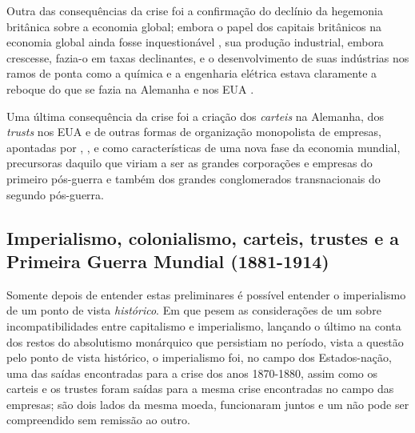 Outra das consequências da crise foi a confirmação do declínio da hegemonia britânica sobre a economia global; embora o papel dos capitais britânicos na economia global ainda fosse inquestionável \cite{goetzmann_british_2006,rippy_britlat_1954,stone_british_1977}, sua produção industrial, embora crescesse, fazia-o em taxas declinantes, e o desenvolvimento de suas indústrias nos ramos de ponta como a química e a engenharia elétrica estava claramente a reboque do que se fazia na Alemanha e nos EUA \cite[p.~207]{Musson1959}. 

Uma última consequência da crise foi a criação dos \textit{carteis} na Alemanha, dos \textit{trusts} nos EUA e de outras formas de organização monopolista de empresas, apontadas por , , e  como características de uma nova fase da economia mundial, precursoras daquilo que viriam a ser as grandes corporações e empresas do primeiro pós-guerra e também dos grandes conglomerados transnacionais do segundo pós-guerra.

\subsection{Imperialismo, colonialismo, carteis, trustes e a Primeira Guerra Mundial (1881-1914)} \label{sec:impercol}

Somente depois de entender estas preliminares é possível entender o imperialismo de um ponto de vista \textit{histórico}. Em que pesem as considerações de um  sobre incompatibilidades entre capitalismo e imperialismo, lançando o último na conta dos restos do absolutismo monárquico que persistiam no período, vista a questão pelo ponto de vista histórico, o imperialismo foi, no campo dos Estados-nação, uma das saídas encontradas para a crise dos anos 1870-1880, assim como os carteis e os trustes foram saídas para a mesma crise encontradas no campo das empresas; são dois lados da mesma moeda, funcionaram juntos e um não pode ser compreendido sem remissão ao outro.

